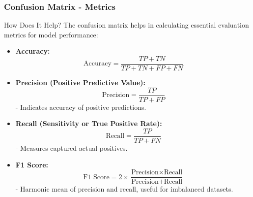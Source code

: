 \documentclass[aspectratio=169]{beamer}
\begin{document}
\begin{frame}[fragile]
  \frametitle{Confusion Matrix - Metrics}
  
  \begin{block}{How Does It Help?}
    The confusion matrix helps in calculating essential evaluation metrics for model performance:
  \end{block}
  
  \begin{itemize}
    \item \textbf{Accuracy:} 
      \begin{equation}
        \text{Accuracy} = \frac{TP + TN}{TP + TN + FP + FN}
      \end{equation}
      
    \item \textbf{Precision (Positive Predictive Value):} 
      \begin{equation}
        \text{Precision} = \frac{TP}{TP + FP}
      \end{equation}
      - Indicates accuracy of positive predictions.
      
    \item \textbf{Recall (Sensitivity or True Positive Rate):}
      \begin{equation}
        \text{Recall} = \frac{TP}{TP + FN}
      \end{equation}
      - Measures captured actual positives.
      
    \item \textbf{F1 Score:} 
      \begin{equation}
        \text{F1 Score} = 2 \times \frac{\text{Precision} \times \text{Recall}}{\text{Precision} + \text{Recall}}
      \end{equation}
      - Harmonic mean of precision and recall, useful for imbalanced datasets.
  \end{itemize}
\end{frame}
\end{document}
